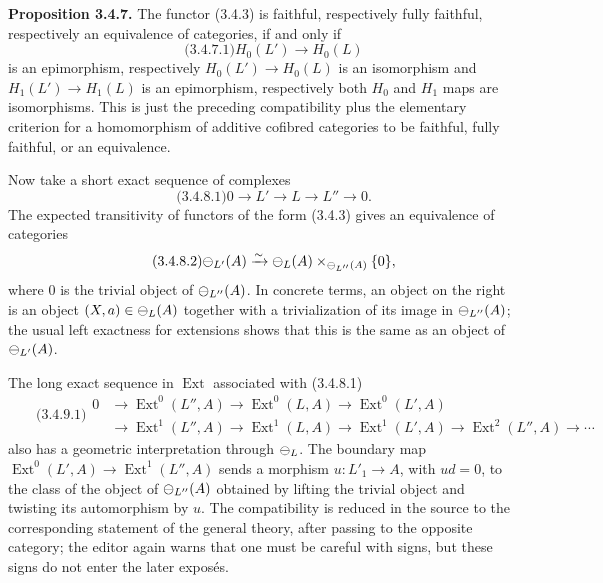 \documentclass[11pt]{article}
\providecommand{\Ext}{\operatorname{Ext}}
\begin{document}
\textbf{Proposition 3.4.7.}  The functor (3.4.3) is faithful, respectively fully faithful, respectively an equivalence of categories, if and only if
\begin{equation}\qquad\text{(3.4.7.1)}
  H_0(L')\longrightarrow H_0(L)
\end{equation}
is an epimorphism, respectively \(H_0(L')\to H_0(L)\) is an isomorphism and \(H_1(L')\to H_1(L)\) is an epimorphism, respectively both \(H_0\) and \(H_1\) maps are isomorphisms.  This is just the preceding compatibility plus the elementary criterion for a homomorphism of additive cofibred categories to be faithful, fully faithful, or an equivalence.

Now take a short exact sequence of complexes
\begin{equation}\qquad\text{(3.4.8.1)}
  0\longrightarrow L'\longrightarrow L\longrightarrow L''\longrightarrow0.
\end{equation}
The expected transitivity of functors of the form (3.4.3) gives an equivalence of categories
\begin{equation}\qquad\text{(3.4.8.2)}
  \mathcal\Psi_{L'}(A)\xrightarrow{\sim}\mathcal\Psi_L(A)\times_{\mathcal\Psi_{L''}(A)}\{0\},
\end{equation}
where \(0\) is the trivial object of \(\mathcal\Psi_{L''}(A)\).  In concrete terms, an object on the right is an object \((X,a)\in\mathcal\Psi_L(A)\) together with a trivialization of its image in \(\mathcal\Psi_{L''}(A)\); the usual left exactness for extensions shows that this is the same as an object of \(\mathcal\Psi_{L'}(A)\).

The long exact sequence in \(\Ext\) associated with (3.4.8.1)
\begin{equation}\qquad\text{(3.4.9.1)}
\begin{aligned}
0&\to\Ext^0(L'',A)\to\Ext^0(L,A)\to\Ext^0(L',A)\\
 &\to\Ext^1(L'',A)\to\Ext^1(L,A)\to\Ext^1(L',A)\to\Ext^2(L'',A)\to\cdots
\end{aligned}
\end{equation}
also has a geometric interpretation through \(\mathcal\Psi_L\).  The boundary map \(\Ext^0(L',A)\to\Ext^1(L'',A)\) sends a morphism \(u:L'_1\to A\), with \(u d=0\), to the class of the object of \(\mathcal\Psi_{L''}(A)\) obtained by lifting the trivial object and twisting its automorphism by \(u\).  The compatibility is reduced in the source to the corresponding statement of the general theory, after passing to the opposite category; the editor again warns that one must be careful with signs, but these signs do not enter the later expos\'es.
\end{document}
